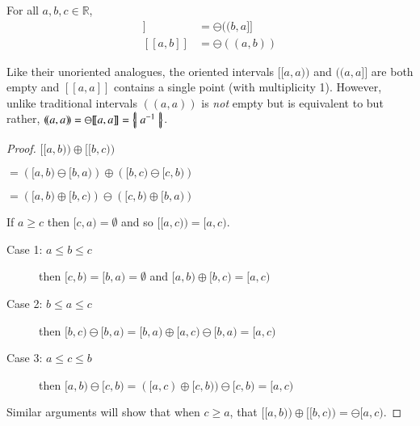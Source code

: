 
\begin{theorem} For all $a,b,c \in \mathbb{R}$, 
	\begin{align}
		[\![a,b)\!) &= \ominus [\![b,a)\!) \\
		(\!(a,b]\!] &= \ominus (\!(b,a]\!] \\
		[\![a,b]\!] &= \ominus (\!(a,b)\!)
	\end{align}
\end{theorem}

Like their unoriented analogues, the oriented intervals $[\![ a,a )\!)$ and $(\!( a,a ]\!]$ are both empty and $[\![a,a]\!]$ contains a single point (with multiplicity 1).
However, unlike traditional intervals $(\!(a,a)\!)$ is \emph{not} empty but is equivalent to but rather, $(\!(a,a)\!) = \ominus [\![a,a]\!] = \left\{ \! \left| \; a^{-1} \; \right| \! \right\}$.


\begin{theorem}
	For all $a,b,c \in \mathbb{R}$ (regardless of relative ordering),
	\begin{equation}
		[\![ a,b )\!) \oplus [\![ b,c )\!) = [\![ a,c )\!)
	\end{equation}
\end{theorem}

\begin{proof}
	$[\![a,b)\!) \oplus [\![ b,c )\!)$ 

	$= \left( [a,b) \ominus [b,a) \right) \oplus \left( [b,c) \ominus [c,b) \right)$ 

	$= \left( [a,b) \oplus [b,c) \right) \ominus \left( [c,b) \oplus [b,a) \right)$

	If $a \geq c$ then $[c,a) = \emptyset$ and so $[\![a,c)\!) = [a,c)$. 
	\begin{description}
		\item[Case 1: $a \leq b \leq c$] then $[c,b) = [b,a) = \emptyset$ and $[a,b) \oplus [b,c) = [a,c)$
		\item[Case 2: $b \leq a \leq c$] then $[b,c) \ominus [b,a) = [b,a) \oplus [a,c) \ominus [b,a) = [a,c)$
		\item[Case 3: $a \leq c \leq b$] then $[a,b) \ominus [c,b) = ([a,c) \oplus [c,b)) \ominus [c,b) = [a,c)$
	\end{description}
	Similar arguments will show that when $c \geq a$, that $[\![a,b)\!) \oplus [\![ b,c )\!) = \ominus [a,c)$.
	
\end{proof}

